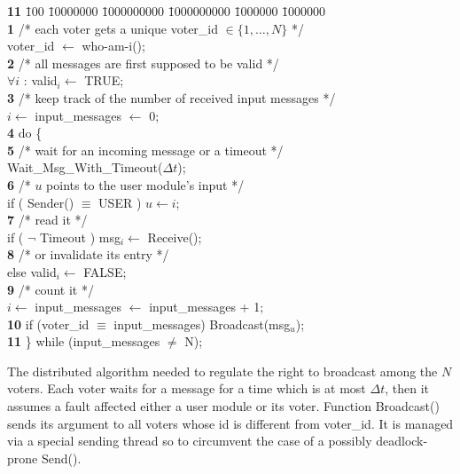 \documentclass[11pt]{article}
\begin{document}
\begin{table}[h]
\begin{small}
\begin{sf}
\hrulefill
\vspace*{-12pt}
\begin{tabbing}
{\bf 11} \= 100 \= 10000000 \= 1000000000 \= 1000000000 \= 1000000 \= 1000000\kill\\
{\bf 1} \> /* each voter gets a unique voter\_id $\in\{1,\ldots,N\}$ */ \\
        \> voter\_id $\leftarrow$ who-am-i();\\
{\bf 2} \> /* all messages are first supposed to be valid */\\
        \> $\forall i$ : valid${}_i \leftarrow$ TRUE; \\
{\bf 3} \> /* keep track of the number of received input messages */\\
        \> $i\leftarrow$ input\_messages $\leftarrow$ 0;\\
{\bf 4} \> do \{ \\
{\bf 5} \>\> /* wait for an incoming message or a timeout */\\
        \> \> Wait\_Msg\_With\_Timeout($\Delta t$);\\
{\bf 6} \>\>/* $u$ points to the user module's input */\\
        \>\> if ( Sender() $\equiv$ USER ) $u \leftarrow i$; \\
{\bf 7} \>\>/* read it */\\
        \>\> if ( $\neg$ Timeout ) msg${}_i \leftarrow$ Receive(); \\
{\bf 8} \>\>/* or invalidate its entry */\\
        \>\> else valid${}_i \leftarrow$  FALSE; \\
{\bf 9} \>\>/* count it */\\
        \>\> $i\leftarrow$ input\_messages $\leftarrow$ input\_messages + 1;\\
{\bf 10} \> \> if (voter\_id $\equiv$ input\_messages) Broadcast(msg${}_u$);\\
{\bf 11}\> \} while (input\_messages $\neq$ N);
\end{tabbing}
\vspace*{-5pt}
\hrulefill
\end{sf}
\end{small}
\caption{The distributed algorithm needed to regulate the right to
broadcast among the $N$ voters. Each voter waits for a message
for a time which is at most $\Delta t$, then it assumes a fault affected
either a user module or its voter. Function {\sf Broadcast()} 
sends its argument to all voters whose id is different from
{\sf voter\_id}. It is managed via a special sending thread so to
circumvent the case of a possibly deadlock-prone {\sf Send()}.}
\label{broadcast}
\end{table}
\end{document}
